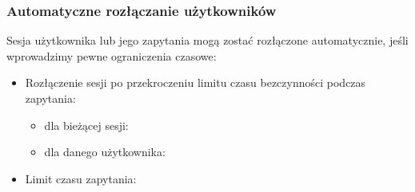 \documentclass[letterpaper,10pt,polish]{sphinxmanual}
\begin{document}
\subsubsection{Automatyczne rozłączanie użytkowników}
\label{\detokenize{rozdzial2/Kontrola_i_konserwacja/kontrola_i_konserwacja:automatyczne-rozlaczanie-uzytkownikow}}
\sphinxAtStartPar
Sesja użytkownika lub jego zapytania mogą zostać rozłączone automatycznie, jeśli wprowadzimy pewne ograniczenia czasowe:
\begin{itemize}
\item {} 
\sphinxAtStartPar
Rozłączenie sesji po przekroczeniu limitu czasu bezczynności podczas zapytania:
\begin{itemize}
\item {} 
\sphinxAtStartPar
dla bieżącej sesji:
\begin{quote}

\begin{sphinxVerbatim}[commandchars=\\\{\}]
\end{sphinxVerbatim}
\end{quote}

\item {} 
\sphinxAtStartPar
dla danego użytkownika:
\begin{quote}

\begin{sphinxVerbatim}[commandchars=\\\{\}]
\end{sphinxVerbatim}
\end{quote}

\end{itemize}

\item {} 
\sphinxAtStartPar
Limit czasu zapytania:
\begin{quote}

\begin{sphinxVerbatim}[commandchars=\\\{\}]
\end{sphinxVerbatim}
\end{quote}

\end{itemize}
\end{document}
